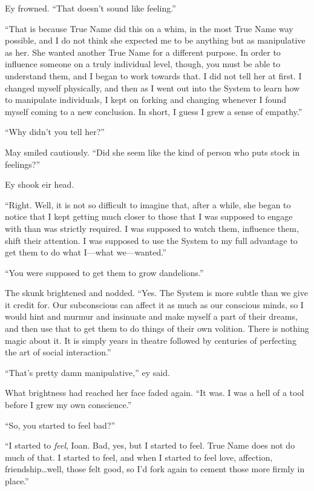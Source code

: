 Ey frowned. ``That doesn't sound like feeling.''

``That is because True Name did this on a whim, in the most True Name way possible, and I do not think she expected me to be anything but as manipulative as her. She wanted another True Name for a different purpose. In order to influence someone on a truly individual level, though, you must be able to understand them, and I began to work towards that. I did not tell her at first. I changed myself physically, and then as I went out into the System to learn how to manipulate individuals, I kept on forking and changing whenever I found myself coming to a new conclusion. In short, I guess I grew a sense of empathy.''

``Why didn't you tell her?''

May smiled cautiously. ``Did she seem like the kind of person who puts stock in feelings?''

Ey shook eir head.

``Right. Well, it is not so difficult to imagine that, after a while, she began to notice that I kept getting much closer to those that I was supposed to engage with than was strictly required. I was supposed to watch them, influence them, shift their attention. I was supposed to use the System to my full advantage to get them to do what I---what we---wanted.''

``You were supposed to get them to grow dandelions.''

The skunk brightened and nodded. ``Yes. The System is more subtle than we give it credit for. Our subconscious can affect it as much as our conscious minds, so I would hint and murmur and insinuate and make myself a part of their dreams, and then use that to get them to do things of their own volition. There is nothing magic about it. It is simply years in theatre followed by centuries of perfecting the art of social interaction.''

``That's pretty damn manipulative,'' ey said.

What brightness had reached her face faded again. ``It was. I was a hell of a tool before I grew my own conscience.''

``So, you started to feel bad?''

``I started to \emph{feel}, Ioan. Bad, yes, but I started to feel. True Name does not do much of that. I started to feel, and when I started to feel love, affection, friendship\ldots well, those felt good, so I'd fork again to cement those more firmly in place.''

